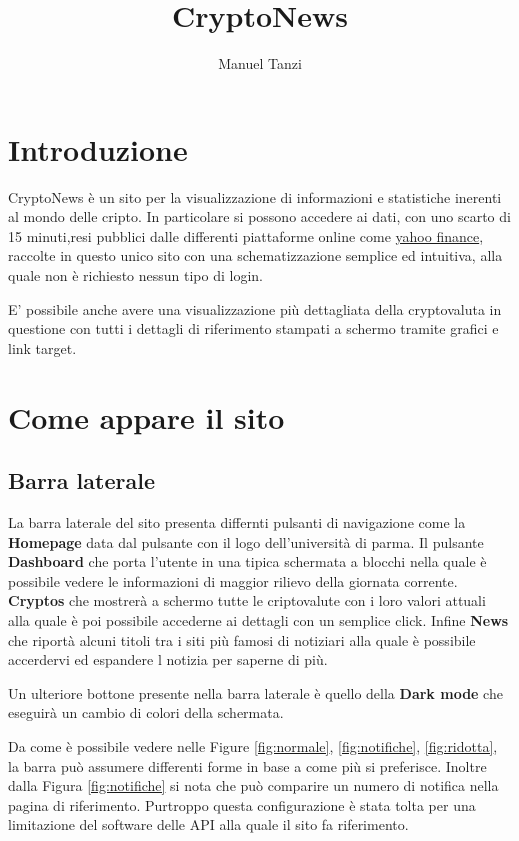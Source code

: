 \documentclass{article}
\title{CryptoNews}
\author{Manuel Tanzi}
\begin{document}
\maketitle


\section{Introduzione}

CryptoNews è un sito per la visualizzazione di informazioni e statistiche inerenti al mondo delle cripto.
In particolare si possono accedere ai dati, con uno scarto di 15 minuti,resi pubblici dalle differenti piattaforme online come \href{https://it.finance.yahoo.com/}{yahoo finance}, raccolte in questo unico sito con una schematizzazione semplice ed intuitiva, alla quale non è richiesto nessun tipo di login.

E' possibile anche avere una visualizzazione più dettagliata della cryptovaluta in questione con tutti i dettagli di riferimento stampati a schermo tramite grafici e link target. 

\section{Come appare il sito}

\subsection{Barra laterale}
La barra laterale del sito presenta differnti pulsanti di navigazione come la \textbf{Homepage} data dal pulsante con il logo dell'università di parma.
Il pulsante \textbf{Dashboard} che porta l'utente in una tipica schermata a blocchi nella quale è possibile vedere le informazioni di maggior rilievo della giornata corrente.
\textbf{Cryptos} che mostrerà a schermo tutte le criptovalute con i loro valori attuali alla quale è poi possibile accederne ai dettagli con un semplice click.
Infine \textbf{News} che riportà alcuni titoli tra i siti più famosi di notiziari alla quale è possibile accerdervi ed espandere l notizia per saperne di più.

Un ulteriore bottone presente nella barra laterale è quello della \textbf{Dark mode} che eseguirà un cambio di colori della schermata.


Da come è possibile vedere nelle Figure \ref{fig:normale},  \ref{fig:notifiche}, \ref{fig:ridotta}, la barra può assumere differenti forme in base a come più si preferisce.
Inoltre dalla Figura \ref{fig:notifiche} si nota che può comparire un numero di notifica nella pagina di riferimento. Purtroppo questa configurazione è stata tolta per una limitazione del software delle API alla quale il sito fa riferimento.
\end{document}
